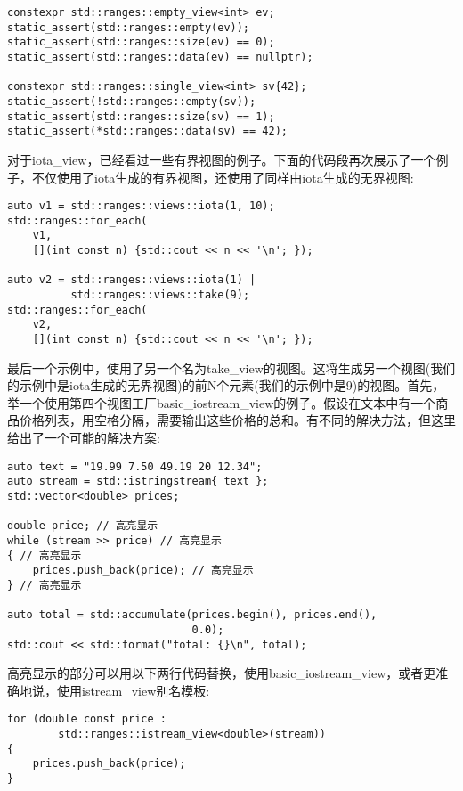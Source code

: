 \begin{lstlisting}[style=styleCXX]
constexpr std::ranges::empty_view<int> ev;
static_assert(std::ranges::empty(ev));
static_assert(std::ranges::size(ev) == 0);
static_assert(std::ranges::data(ev) == nullptr);

constexpr std::ranges::single_view<int> sv{42};
static_assert(!std::ranges::empty(sv));
static_assert(std::ranges::size(sv) == 1);
static_assert(*std::ranges::data(sv) == 42);
\end{lstlisting}

对于iota\_view，已经看过一些有界视图的例子。下面的代码段再次展示了一个例子，不仅使用了iota生成的有界视图，还使用了同样由iota生成的无界视图:

\begin{lstlisting}[style=styleCXX]
auto v1 = std::ranges::views::iota(1, 10);
std::ranges::for_each(
	v1,
	[](int const n) {std::cout << n << '\n'; });
	
auto v2 = std::ranges::views::iota(1) |
		  std::ranges::views::take(9);
std::ranges::for_each(
	v2,
	[](int const n) {std::cout << n << '\n'; });
\end{lstlisting}

最后一个示例中，使用了另一个名为take\_view的视图。这将生成另一个视图(我们的示例中是iota生成的无界视图)的前N个元素(我们的示例中是9)的视图。首先，举一个使用第四个视图工厂basic\_iostream\_view的例子。假设在文本中有一个商品价格列表，用空格分隔，需要输出这些价格的总和。有不同的解决方法，但这里给出了一个可能的解决方案:

\begin{lstlisting}[style=styleCXX]
auto text = "19.99 7.50 49.19 20 12.34";
auto stream = std::istringstream{ text };
std::vector<double> prices;

double price; // 高亮显示
while (stream >> price) // 高亮显示
{ // 高亮显示
	prices.push_back(price); // 高亮显示
} // 高亮显示

auto total = std::accumulate(prices.begin(), prices.end(),
							 0.0);
std::cout << std::format("total: {}\n", total);
\end{lstlisting}

高亮显示的部分可以用以下两行代码替换，使用basic\_iostream\_view，或者更准确地说，使用istream\_view别名模板:

\begin{lstlisting}[style=styleCXX]
for (double const price :
		std::ranges::istream_view<double>(stream))
{
	prices.push_back(price);
}
\end{lstlisting}

